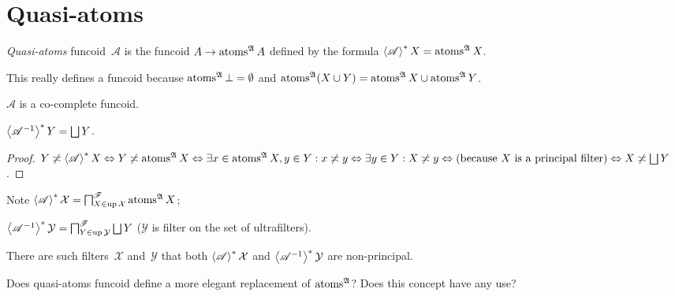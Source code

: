\chapter{Quasi-atoms}

\begin{defn}
\emph{Quasi-atoms} funcoid~$\mathscr{A}$ is the funcoid $A\rightarrow \operatorname{atoms}^{\mathfrak{A}} A$ defined by the formula
$\left\langle \mathscr{A}\right\rangle ^{\ast} X = \operatorname{atoms}^{\mathfrak{A}} X$.
\end{defn}

This really defines a funcoid because $\operatorname{atoms}^{\mathfrak{A}} \bot = \emptyset$ and
$\operatorname{atoms}^{\mathfrak{A}}(X\cup Y) = \operatorname{atoms}^{\mathfrak{A}}X\cup\operatorname{atoms}^{\mathfrak{A}}Y$.

\begin{obvious}
$\mathscr{A}$ is a co-complete funcoid.
\end{obvious}

\begin{prop}
$\rsupfun{\mathscr{A}^{-1}} Y = \bigsqcup Y$.
\end{prop}

\begin{proof}
$Y \nasymp \left\langle \mathscr{A} \right\rangle^{\ast} X \Leftrightarrow Y
\nasymp \atoms^{\mathfrak{A}} X \Leftrightarrow \exists x \in
\atoms^{\mathfrak{A}} X, y \in Y : x \nasymp y \Leftrightarrow \exists y
\in Y : X \nasymp y \Leftrightarrow \text{(because $X$ is a principal filter)}
\Leftrightarrow X \nasymp \bigsqcup Y$.
\end{proof}

Note
$\left\langle \mathscr{A}\right\rangle ^{\ast} \mathcal{X} =
\bigsqcap^{\mathscr{F}}_{X \in \operatorname{up} \mathcal{X}}
\operatorname{atoms}^{\mathfrak{A}} X$;

$\rsupfun{\mathscr{A}^{-1}} \mathcal{Y} =
\bigsqcap^{\mathscr{F}}_{Y \in \up \mathcal{Y}} \bigsqcup Y$
($\mathcal{Y}$ is filter on the set of ultrafilters).

\begin{conjecture}
There are such filters~$\mathcal{X}$ and~$\mathcal{Y}$ that
both $\left\langle \mathscr{A}\right\rangle ^{\ast} \mathcal{X}$ and $\left\langle \mathscr{A}^{-1}\right\rangle ^{\ast} \mathcal{Y}$
are non-principal.
\end{conjecture}

Does quasi-atoms funcoid define a more elegant replacement of $\operatorname{atoms}^{\mathfrak{A}}$? Does this concept have any use?